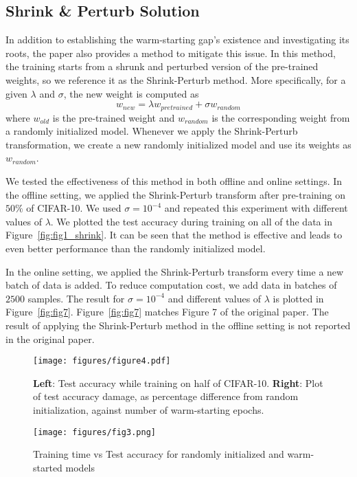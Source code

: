 \subsection{Shrink \& Perturb Solution}
In addition to establishing the warm-starting gap's existence and investigating its roots, the paper also provides a method to mitigate this issue. In this method, the training starts from a shrunk and perturbed version of the pre-trained weights, so we reference it as the Shrink-Perturb method. More specifically, for a given $\lambda$ and $\sigma$, the new weight is computed as
\begin{equation}
w_{new} =  \lambda w_{pretrained} + \sigma w_{random}
\end{equation}
where $w_{old}$ is the pre-trained weight and $w_{random}$ is the corresponding weight from a randomly initialized model. Whenever we apply the Shrink-Perturb transformation, we create a new randomly initialized model and use its weights as $w_{random}$. 

We tested the effectiveness of this method in both offline and online settings. In the offline setting, we applied the Shrink-Perturb transform after pre-training on $50\%$ of CIFAR-10. We used $\sigma = 10^{-4}$ and repeated this experiment with different values of $\lambda$. We plotted the test accuracy during training on all of the data in Figure~\ref{fig:fig1_shrink}. It can be seen that the method is effective and leads to even better performance than the randomly initialized model. 

In the online setting, we applied the Shrink-Perturb transform every time a new batch of data is added. To reduce computation cost, we add data in batches of $2500$ samples. The result for $\sigma = 10^{-4}$ and different values of $\lambda$ is plotted in Figure~\ref{fig:fig7}. Figure~\ref{fig:fig7} matches Figure 7 of the original paper. The result of applying the Shrink-Perturb method in the offline setting is not reported in the original paper.


\begin{figure}
\begin{minipage}[t]{.55\linewidth}
    \texttt{[image: figures/figure4.pdf]}
    \caption{\textbf{Left}: Test accuracy while training on half of CIFAR-10. \textbf{Right}: Plot of test accuracy damage, as percentage difference from random initialization, against number of warm-starting epochs. }
    \label{fig:fig4-different-checkpoints}
\end{minipage}
\hfill
\begin{minipage}[t]{.4\linewidth}
    \texttt{[image: figures/fig3.png]}
    \caption{Training time vs Test accuracy for randomly initialized and warm-started models}
    \label{fig:fig3-scatter} 
\end{minipage}
\end{figure}


